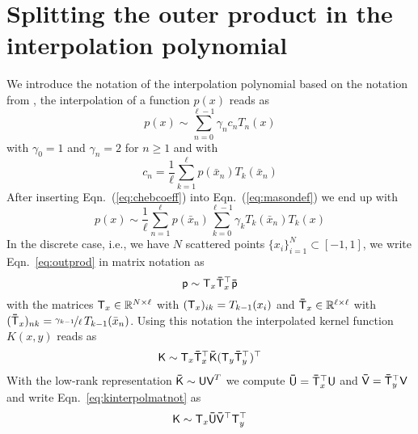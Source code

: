 
\section{Splitting the outer product in the interpolation polynomial}
\label{sec:splitouter}

We introduce the notation of the interpolation polynomial based on the
notation from \cite{mason2003chebyshev}, the interpolation of a function
$p(x)$ reads as
\begin{equation}
  \label{eq:masondef}
  p(x) \sim \sum_{n=0}^{\ell-1} \gamma_n c_n T_n(x)
\end{equation}
with $\gamma_0=1$ and $\gamma_n=2$ for $n\ge1$ and with
\begin{equation}
  \label{eq:chebcoeff}
  c_n = \frac{1}{\ell} \sum_{k=1}^\ell p(\bar x_n) T_k(\bar x_n)
\end{equation}
After inserting Eqn.~(\ref{eq:chebcoeff}) into Eqn.~(\ref{eq:masondef}) we end
up with
\begin{equation}
  \label{eq:outprod}
  p(x) \sim \frac{1}{\ell} \sum_{n=1}^\ell p(\bar x_n) \sum_{k=0}^{\ell-1}
  \gamma_k T_k(\bar x_n) T_k(x)
\end{equation}
In the discrete case, i.e., we have $N$ scattered points $\{x_i\}_{i=1}^N
\subset [-1,1]$, we write Eqn.~\eqref{eq:outprod} in matrix notation as
\begin{equation}
  \label{eq:interpolmatnot}
  \mathsf{p} \sim \mathsf{T}_x \mathsf{\bar T}_x^\top \mathsf{\bar p}
\end{equation}
with the matrices $\mathsf{T}_x \in \mathbb{R}^{N\times\ell}$ with
$(\mathsf{T}_x)_{ik} = T_{k-1}(x_i)$ and $\mathsf{\bar T}_x \in
\mathbb{R}^{\ell\times\ell}$ with $(\mathsf{\bar T}_x)_{nk} =
\nicefrac{\gamma_{k-1}}{\ell} \, T_{k-1}(\bar x_n)$. Using this notation the
interpolated kernel function $K(x,y)$ reads as
\begin{equation}
  \label{eq:kinterpolmatnot}
  \mathsf{K} \sim \mathsf{T}_x \mathsf{\bar T}_x^\top \mathsf{\bar K} (\mathsf{T}_y
  \mathsf{\bar T}_y^\top)^\top
\end{equation}
With the low-rank representation $\mathsf{\bar K} \sim \mathsf{UV}^T$ we compute
$\mathsf{\bar U} = \mathsf{\bar T}_x^\top \mathsf{U}$ and $\mathsf{\bar V} = \mathsf{\bar
  T}_y^\top \mathsf{V}$ and write Eqn.~\eqref{eq:kinterpolmatnot} as
\begin{equation}
  \label{eq:kinterpolmatnot1}
  \mathsf{K} \sim \mathsf{T}_x \mathsf{\bar U} \mathsf{\bar V}^\top \mathsf{T}_y^\top
\end{equation}

